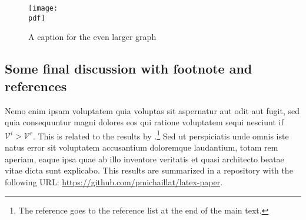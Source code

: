 \documentclass[letterpaper,12pt,leqno]{article}
\newcommand{\pdf}{figures.pdf}
\begin{document}
\begin{figure}[t]
\texttt{[image: \\pdf]}
\caption{A caption for the even larger graph}
\label{f:appendix2}\end{figure}


\subsection{Some final discussion with footnote and references}\label{a:subappendix}

Nemo enim ipsam voluptatem quia voluptas sit aspernatur aut odit aut fugit, sed quia consequuntur magni dolores eos qui ratione voluptatem sequi nesciunt if $\mathcal{V}^i > \mathcal{V}^r$. This is related to the results by \citet{MS21b}.\footnote{The reference goes to the reference list at the end of the main text.} Sed ut perspiciatis unde omnis iste natus error sit voluptatem accusantium doloremque laudantium, totam rem aperiam, eaque ipsa quae ab illo inventore veritatis et quasi architecto beatae vitae dicta sunt explicabo. This results are summarized in a repository with the following URL: \url{https://github.com/pmichaillat/latex-paper}.
\end{document}
